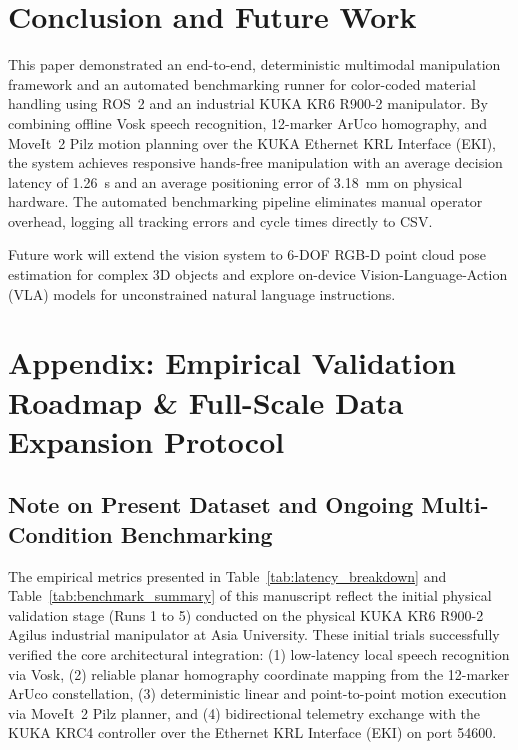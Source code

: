 \documentclass[runningheads]{llncs}
\begin{document}
\section{Conclusion and Future Work}
\label{sec:conclusion}

This paper demonstrated an end-to-end, deterministic multimodal manipulation framework and an automated benchmarking runner for color-coded material handling using ROS~2 and an industrial KUKA KR6 R900-2 manipulator. By combining offline Vosk speech recognition, 12-marker ArUco homography, and MoveIt~2 Pilz motion planning over the KUKA Ethernet KRL Interface (EKI), the system achieves responsive hands-free manipulation with an average decision latency of \SI{1.26}{\second} and an average positioning error of \SI{3.18}{\milli\meter} on physical hardware. The automated benchmarking pipeline eliminates manual operator overhead, logging all tracking errors and cycle times directly to CSV.

Future work will extend the vision system to 6-DOF RGB-D point cloud pose estimation for complex 3D objects and explore on-device Vision-Language-Action (VLA) models for unconstrained natural language instructions.




\newpage
\section*{Appendix: Empirical Validation Roadmap \& Full-Scale Data Expansion Protocol}

\subsection*{Note on Present Dataset and Ongoing Multi-Condition Benchmarking}
The empirical metrics presented in Table~\ref{tab:latency_breakdown} and Table~\ref{tab:benchmark_summary} of this manuscript reflect the initial physical validation stage (Runs 1 to 5) conducted on the physical KUKA KR6 R900-2 Agilus industrial manipulator at Asia University. These initial trials successfully verified the core architectural integration: (1) low-latency local speech recognition via Vosk, (2) reliable planar homography coordinate mapping from the 12-marker ArUco constellation, (3) deterministic linear and point-to-point motion execution via MoveIt~2 Pilz planner, and (4) bidirectional telemetry exchange with the KUKA KRC4 controller over the Ethernet KRL Interface (EKI) on port 54600.
\end{document}
